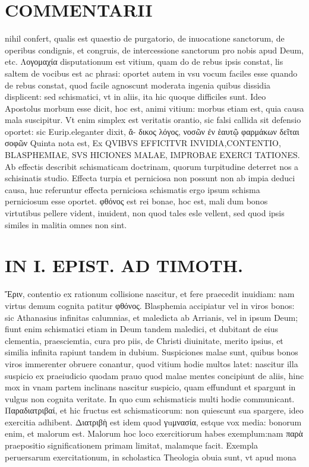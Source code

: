 \documentclass{article}
\begin{document}
\begin{pages}
\section*{COMMENTARII }
\marginpar{[ p.152 ]}\pstart nihil confert, qualis est quaestio de purgatorio, de inuocatione sanctorum, de operibus condignis, et congruis, de intercessione sanctorum pro nobis apud Deum, etc.  \pend\pstart Λογομαχία disputationum est vitium, quam do de rebus ipsis constat, lis saltem de vocibus est ac phrasi: oportet autem in vsu vocum faciles esse quando de rebus constat, quod facile agnoscunt moderata ingenia quibus dissidia displicent: sed schismatici, vt in aliis, ita hic quoque difficiles sunt. Ideo Apostolus morbum esse dicit, hoc est, animi vitium: morbus etiam est, quia causa mala suscipitur. Vt enim simplex est veritatis orantio, sic falsi callida sit defensio oportet: sic Eurip.eleganter dixit, ἄ- δικος λόγος, νοσῶν ἐν ἑαυτῷ φαρμάκων δεῖται σοφῶν  \pend\pstart Quinta nota est, Ex QVIBVS EFFICITVR INVIDIA,CONTENTIO, BLASPHEMIAE, SVS HICIONES MALAE, IMPROBAE EXERCI TATIONES. Ab effectis describit schismaticam doctrinam, quorum turpitudine deterret nos a schisinatis studio. Effecta turpia et perniciosa non possunt non ab impia deduci causa, huc referuntur effecta perniciosa schismatis ergo ipsum schisma perniciosum esse oportet. φθόνος est rei bonae, hoc est, mali dum bonos virtutibus pellere vident, inuident, non quod tales esle vellent, sed quod ipsis similes in malitia omnes non sint.  \pend
\section*{IN I. EPIST. AD TIMOTH. }
\marginpar{[ p.153 ]}\pstart Ἔριν, contentio ex rationum collisione nascitur, et fere praecedit inuidiam: nam virtus demum cognita patitur φθόνος.  \pend\pstart Blasphemia accipiatur vel in viros bonos: sic Athanasius infinitas calumnias, et maledicta ab Arrianis, vel in ipsum Deum; fiunt enim schismatici etiam in Deum tandem maledici, et dubitant de eius clementia, praesciemtia, cura pro piis, de Christi diuinitate, merito ipsius, et similia infinita rapiunt tandem in dubium.  \pend\pstart Suspiciones malae sunt, quibus bonos viros immerenter obruere conantur, quod vitium hodie multos latet: nascitur illa suspicio ex praeiudicio quodam prauo quod malae mentes concipiunt de aliis, hinc mox in vnam partem inclinans nascitur suspicio, quam effundunt et spargunt in vulgus non cognita veritate. In quo cum schismaticis multi hodie communicant.  \pend\pstart Παραδιατριβαί, et hic fructus est schismaticorum: non quiescunt sua spargere, ideo exercitia adhibent. Διατριβὴ est idem quod γuμνασία, estque vox media: bonorum enim, et malorum est. Malorum hoc loco exercitiorum habes exemplum:nam παρὰ praepositio significationem primam limitat, malamque facit. Exempla peruersarum exercitationum, in scholastica Theologia obuia sunt, vt apud mona\pend

\end{pages}
\end{document}
